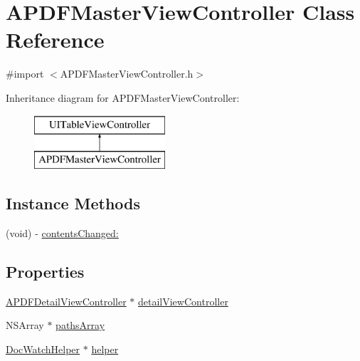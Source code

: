 \hypertarget{interface_a_p_d_f_master_view_controller}{\section{A\-P\-D\-F\-Master\-View\-Controller Class Reference}
\label{interface_a_p_d_f_master_view_controller}
}


{\ttfamily \#import $<$A\-P\-D\-F\-Master\-View\-Controller.\-h$>$}

Inheritance diagram for A\-P\-D\-F\-Master\-View\-Controller\-:\begin{figure}[H]
\begin{center}
\leavevmode
\includegraphics[height=2.000000cm]{interface_a_p_d_f_master_view_controller}
\end{center}
\end{figure}
\subsection*{Instance Methods}
\begin{DoxyCompactItemize}
\item 
(void) -\/ \hyperlink{interface_a_p_d_f_master_view_controller_a8dd26c407be95d9e7eef02397880aeec}{contents\-Changed\-:}
\end{DoxyCompactItemize}
\subsection*{Properties}
\begin{DoxyCompactItemize}
\item 
\hyperlink{interface_a_p_d_f_detail_view_controller}{A\-P\-D\-F\-Detail\-View\-Controller} $\ast$ \hyperlink{interface_a_p_d_f_master_view_controller_a90fcd41e1231cd3413c9b0195dccca2e}{detail\-View\-Controller}
\item 
N\-S\-Array $\ast$ \hyperlink{interface_a_p_d_f_master_view_controller_abd98ad58eefb1b1f67b81aefb3bf7cca}{paths\-Array}
\item 
\hyperlink{interface_doc_watch_helper}{Doc\-Watch\-Helper} $\ast$ \hyperlink{interface_a_p_d_f_master_view_controller_ac8517ec8e07d9227cc32bf3b6ddba3ae}{helper}
\end{DoxyCompactItemize}



